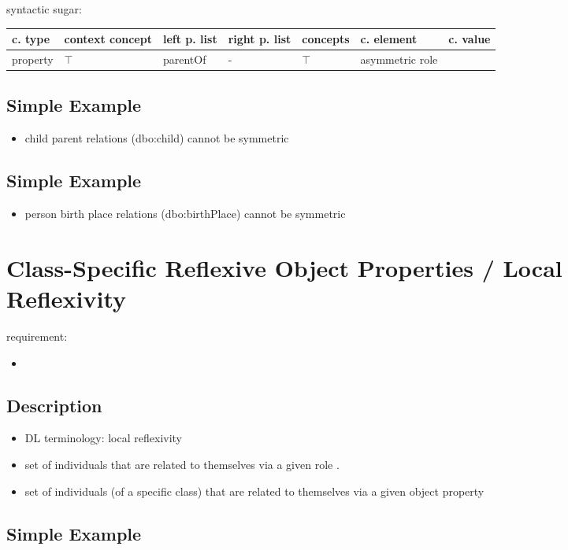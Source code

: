 \documentclass{llncs}
\newenvironment{gcotable}{
  \scriptsize
  \sffamily
  \vspace{0.3cm}
  \begin{tabular}{l|l|l|l|l|l|l}
  \hline
  \textbf{c. type} & \textbf{context concept} & \textbf{left p. list} & \textbf{right p. list} & \textbf{concepts} & \textbf{c. element} & \textbf{c. value} \\
  \hline

}{
  \hline
  \end{tabular}
  \linebreak
}
\begin{document}
syntactic sugar:

\begin{gcotable}
property & $\top$ & parentOf & - & $\top$ & asymmetric role \\
\end{gcotable}

\subsection{Simple Example}

\begin{itemize}
	\item child parent relations (dbo:child) cannot be symmetric
\end{itemize}

\subsection{Simple Example}

\begin{itemize}
	\item person birth place relations (dbo:birthPlace) cannot be symmetric
\end{itemize}

\section{Class-Specific Reflexive Object Properties / Local Reflexivity}

requirement:

\begin{itemize}
	\item 
\end{itemize}

\subsection{Description}

\begin{itemize}
  \item DL terminology: local reflexivity
	\item set of individuals that are related to themselves via a given role \cite{Kroetzsch2012}.
	\item set of individuals (of a specific class) that are related to themselves via a given object property
\end{itemize}

\subsection{Simple Example}
\end{document}
